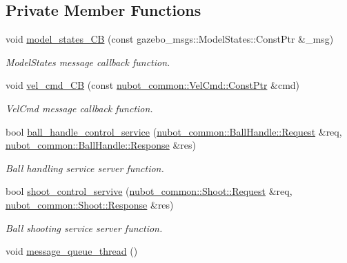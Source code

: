 \subsection*{Private Member Functions}
\begin{DoxyCompactItemize}
\item 
void \hyperlink{classgazebo_1_1NubotGazebo_a96b102bf11d96dda2cdab0f2f9460d8d}{model\-\_\-states\-\_\-\-C\-B} (const gazebo\-\_\-msgs\-::\-Model\-States\-::\-Const\-Ptr \&\-\_\-msg)
\begin{DoxyCompactList}\small\item\em Model\-States message callback function. \end{DoxyCompactList}\item 
void \hyperlink{classgazebo_1_1NubotGazebo_aafe5e8deca0e5a85a30c73629eee8703}{vel\-\_\-cmd\-\_\-\-C\-B} (const \hyperlink{structnubot__common_1_1VelCmd___a5a57f1d76c9209090962bf805a6d8cc8}{nubot\-\_\-common\-::\-Vel\-Cmd\-::\-Const\-Ptr} \&cmd)
\begin{DoxyCompactList}\small\item\em Vel\-Cmd message callback function. \end{DoxyCompactList}\item 
bool \hyperlink{classgazebo_1_1NubotGazebo_ae042db5614aea3da7c8f547c44d9ff6e}{ball\-\_\-handle\-\_\-control\-\_\-service} (\hyperlink{structnubot__common_1_1BallHandle_a02af01a2f731b0fc249f1cf9df23a00e}{nubot\-\_\-common\-::\-Ball\-Handle\-::\-Request} \&req, \hyperlink{structnubot__common_1_1BallHandle_a6c4cc1c333d5fe1cfc569ee22b68ba89}{nubot\-\_\-common\-::\-Ball\-Handle\-::\-Response} \&res)
\begin{DoxyCompactList}\small\item\em Ball handling service server function. \end{DoxyCompactList}\item 
bool \hyperlink{classgazebo_1_1NubotGazebo_ade096537ecc11263f1dd14428325329b}{shoot\-\_\-control\-\_\-servive} (\hyperlink{structnubot__common_1_1Shoot_a8d200603298d1fe7377f13911e7d5bdc}{nubot\-\_\-common\-::\-Shoot\-::\-Request} \&req, \hyperlink{structnubot__common_1_1Shoot_a4d609a5e9faac9c7c0d32b7cf0eb5738}{nubot\-\_\-common\-::\-Shoot\-::\-Response} \&res)
\begin{DoxyCompactList}\small\item\em Ball shooting service server function. \end{DoxyCompactList}\item 
void \hyperlink{classgazebo_1_1NubotGazebo_a2c87fbf2e13762d4827367028d493670}{message\-\_\-queue\-\_\-thread} ()

\end{DoxyCompactItemize}
